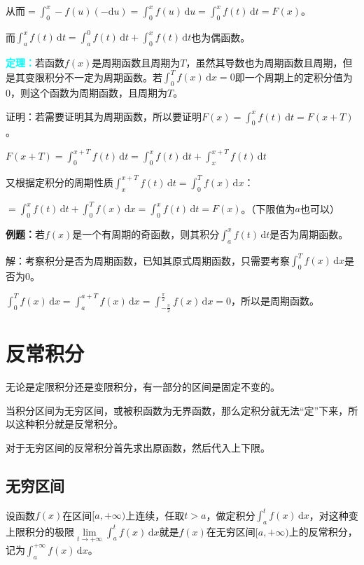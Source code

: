 \documentclass[UTF8, 12pt]{ctexart}
\begin{document}
        从而$=\int_0^x-f(u)(-\textrm{d}u)=\int_0^xf(u)\,\textrm{d}u=\int_0^xf(t)\,\textrm{d}t=F(x)$。

        而$\int_a^xf(t)\,\textrm{d}t=\int_a^0f(t)\,\textrm{d}t+\int_0^xf(t)\,\textrm{d}t$也为偶函数。

        \textcolor{aqua}{\textbf{定理：}}若函数$f(x)$是周期函数且周期为$T$，虽然其导数也为周期函数且周期，但是其变限积分不一定为周期函数。若$\int_0^Tf(x)\,\textrm{d}x=0$即一个周期上的定积分值为0，则这个函数为周期函数，且周期为$T$。

        证明：若需要证明其为周期函数，所以要证明$F(x)=\int_0^xf(t)\,\textrm{d}t=F(x+T)$。

        $F(x+T)=\int_0^{x+T}f(t)\,\textrm{d}t=\int_0^xf(t)\,\textrm{d}t+\int_x^{x+T}f(t)\,\textrm{d}t$

        又根据定积分的周期性质$\int_x^{x+T}f(t)\,\textrm{d}t=\int_0^Tf(x)\,\textrm{d}x$：

        $=\int_0^xf(t)\,\textrm{d}t+\int_0^Tf(x)\,\textrm{d}x=\int_0^xf(t)\,\textrm{d}t=F(x)$。（下限值为$a$也可以）

        \textbf{例题：}若$f(x)$是一个有周期的奇函数，则其积分$\int_a^xf(t)\,\textrm{d}t$是否为周期函数。

        解：考察积分是否为周期函数，已知其原式周期函数，只需要考察$\int_0^Tf(x)\,\textrm{d}x$是否为0。

        $\int_0^Tf(x)\,\textrm{d}x=\int_a^{a+T}f(x)\,\textrm{d}x=\int_{-\frac{\pi}{2}}^{\frac{\pi}{2}}f(x)\,\textrm{d}x=0$，所以是周期函数。

        \section{反常积分}

        无论是定限积分还是变限积分，有一部分的区间是固定不变的。

        当积分区间为无穷区间，或被积函数为无界函数，那么定积分就无法“定”下来，所以这种积分就是反常积分。

        对于无穷区间的反常积分首先求出原函数，然后代入上下限。

        \subsection{无穷区间}

        设函数$f(x)$在区间$[a,+\infty)$上连续，任取$t>a$，做定积分$\int_a^tf(x)\,\textrm{d}x$，对这种变上限积分的极限$\lim\limits_{t\to+\infty}\int_a^tf(x)\,\textrm{d}x$就是$f(x)$在无穷区间$[a,+\infty)$上的反常积分，记为$\int_a^{+\infty}f(x)\,\textrm{d}x$。
\end{document}
